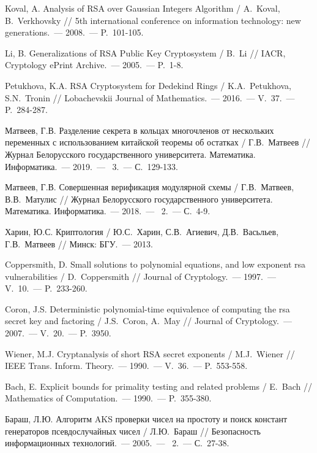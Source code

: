 \documentclass[_00_dissertation.tex]{subfiles}
\begin{document}
\begin{thebibliography}{99}
    Koval, A. Analysis of RSA over Gaussian Integers Algorithm / A.~Koval, B.~Verkhovsky // 5th international conference on information technology: new generations.~--- 2008.~--- P.~101-105.

    Li, B. Generalizations of RSA Public Key Cryptosystem / B.~Li // IACR, Cryptology ePrint Archive.~--- 2005.~--- P.~1-8.

    Petukhova, K.A. RSA Cryptosystem for Dedekind Rings / K.A.~Petukhova, S.N.~Tronin // Lobachevskii Journal of Mathematics.~--- 2016.~--- V.~37.~--- P.~284-287.

    Матвеев, Г.В. Разделение секрета в кольцах многочленов от нескольких переменных с использованием китайской теоремы об остатках / Г.В.~Матвеев // Журнал Белорусского государственного университета. Математика. Информатика.~--- 2019.~--- \textnumero~3.~--- С.~129-133.

    Матвеев, Г.В. Совершенная верификация модулярной схемы / Г.В.~Матвеев, В.В.~Матулис // Журнал Белорусского государственного университета. Математика. Информатика.~--- 2018.~--- \textnumero~2.~--- С.~4-9.

    Харин, Ю.С. Криптология / Ю.С.~Харин, С.В.~Агиевич, Д.В.~Васьльев, Г.В.~Матвеев // Минск: БГУ.~--- 2013.

    Coppersmith, D. Small solutions to polynomial equations, and low exponent rsa vulnerabilities / D.~Coppersmith // Journal of Cryptology.~--- 1997.~--- V.~10.~--- P.~233-260.

    Coron, J.S. Deterministic polynomial-time equivalence of computing the rsa secret key and factoring / J.S.~Coron, A.~May // Journal of Cryptology.~--- 2007.~--- V.~20.~--- P.~3950.

    Wiener, M.J. Cryptanalysis of short RSA secret exponents / M.J.~Wiener // IEEE Trans. Inform. Theory.~--- 1990.~--- V.~36.~--- P.~553-558.

    Bach, E. Explicit bounds for primality testing and related problems / E.~Bach // Mathematics of Computation.~--- 1990.~--- P.~355-380.

    Бараш, Л.Ю. Алгоритм AKS проверки чисел на простоту и поиск констант генераторов псевдослучайных чисел / Л.Ю.~Бараш // Безопасность информационных технологий.~--- 2005.~--- \textnumero~2.~--- С.~27-38.


\end{thebibliography}
\end{document}
